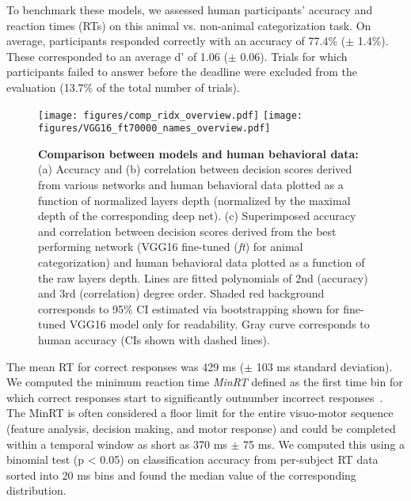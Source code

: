 \documentclass{article}
\begin{document}
To benchmark these models, we assessed human participants' accuracy and reaction times (RTs) on this animal vs. non-animal categorization task. On average, participants responded correctly with an accuracy of 77.4\% ($\pm$ 1.4\%). These corresponded to an average d' of 1.06 ($\pm$ 0.06). Trials for which participants failed to answer before the deadline were excluded from the evaluation (13.7\% of the total number of trials). 




\begin{figure}[t!]
  \begin{center}\vspace{-2.2cm}
    \texttt{[image: figures/comp\_ridx\_overview.pdf]}\vspace{-2mm}
    \texttt{[image: figures/VGG16\_ft70000\_names\_overview.pdf]}\vspace{-4mm}
    \caption[Model accuracy and correlation with human observers]{\textbf{Comparison between models and human behavioral data:} (a) Accuracy and (b) correlation between decision scores derived from various networks and human behavioral data plotted as a function of normalized layers depth (normalized by the maximal depth of the corresponding deep net). (c) Superimposed accuracy and correlation between decision scores derived from the best performing network (VGG16 fine-tuned (\emph{ft}) for animal categorization) and human behavioral data plotted as a function of the raw layers depth. Lines are fitted polynomials of 2nd (accuracy) and 3rd (correlation) degree order. Shaded red background corresponds to 95\% CI estimated via bootstrapping shown for fine-tuned VGG16 model only for readability. Gray curve corresponds to human accuracy (CIs shown with dashed lines).}
    \label{fig:results:dnncomp}\label{fig:results:vgg16}
  \end{center}
\end{figure}


\clearpage




The mean RT for correct responses was 429 ms ($\pm$ 103 ms standard deviation). We computed the minimum reaction time \emph{MinRT} defined as the first time bin for which correct responses start to significantly outnumber incorrect responses~\citep{Fabre-Thorpe2011}. The MinRT is often considered a floor limit for the entire visuo-motor sequence (feature analysis, decision making, and motor response) and could be completed within a temporal window as short as 370 ms $\pm$ 75 ms. We computed this using a binomial test (p < 0.05) on classification accuracy from per-subject RT data sorted into 20 ms bins and found the median value of the corresponding distribution. 
\end{document}
